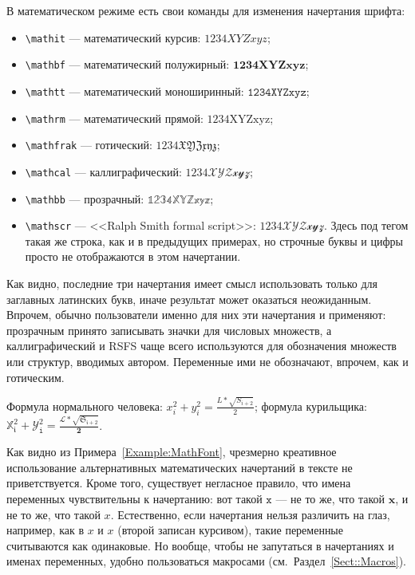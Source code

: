 \documentclass[14pt, russian]{scrartcl}
\begin{document}
В математическом режиме есть свои команды для изменения начертания шрифта:
\begin{itemize}
\item \texttt{\textbackslash mathit} --- математический курсив: $\mathit{1234XYZxyz}$;
\item \texttt{\textbackslash mathbf} --- математический полужирный: $\mathbf{1234XYZxyz}$;
\item \texttt{\textbackslash mathtt} --- математический моноширинный: $\mathtt{1234XYZxyz}$; 
\item \texttt{\textbackslash mathrm} --- математический прямой: $\mathrm{1234XYZxyz}$; 
\item \texttt{\textbackslash mathfrak} --- готический: $\mathfrak{1234XYZxyz}$; 
\item \texttt{\textbackslash mathcal} --- каллиграфический: $\mathcal{1234XYZxyz}$; 
\item \texttt{\textbackslash mathbb} --- прозрачный: $\mathbb{1234XYZxyz}$;
\item \texttt{\textbackslash mathscr} --- <<Ralph Smith formal script>>: $\mathscr{1234XYZxyz}$. Здесь под тегом такая же строка, как и в предыдущих примерах, но строчные буквы и цифры просто не отображаются в этом начертании.
\end{itemize}
Как видно, последние три начертания имеет смысл использовать только для заглавных латинских букв, иначе результат может оказаться неожиданным. Впрочем, обычно пользователи именно для них эти начертания и применяют: прозрачным принято записывать значки для числовых множеств, а каллиграфический и RSFS чаще всего используются для обозначения множеств или структур, вводимых автором. Переменные ими не обозначают, впрочем, как и готическим.

\begin{Example}\label{Example:MathFont}
Формула нормального человека: $x_i^2 + y^2_i = \frac{L*\sqrt{S_{i+2}}}{2}$; формула курильщика: $\mathbb{X}_\mathfrak{i}^\mathfrak{2} + \mathcal{Y}^\mathit{2}_\mathtt{i} = \frac{\mathscr{L}*\sqrt{\mathfrak{S}_\mathfrak{i+2}}}{\mathbf{2}}$.
\end{Example} 

Как видно из Примера~\ref{Example:MathFont}, чрезмерно креативное использование альтернативных математических начертаний в тексте не приветствуется. Кроме того, существует негласное правило, что имена переменных чувствительны к начертанию: вот такой $\mathtt{x}$ --- не то же, что такой $\mathbf{x}$, и не то же, что такой $x$. Естественно, если начертания нельзя различить на глаз, например, как в $x$ и $\mathit{x}$ (второй записан курсивом), такие переменные считываются как одинаковые. Но вообще, чтобы не запутаться в начертаниях и именах переменных, удобно пользоваться макросами (см.~Раздел~\ref{Sect::Macros}).
\end{document}
